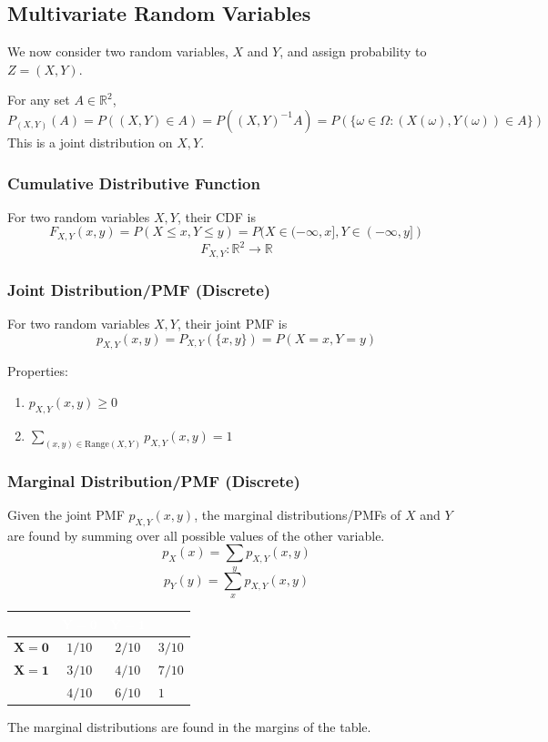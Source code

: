 \documentclass[../Probability.tex]{subfiles}
\begin{document}
\subsection{Multivariate Random Variables}
We now consider two random variables, $X$ and $Y$, and assign probability to $Z=(X,Y)$.

\noindent For any set $A\in\mathbb{R}^2$,
\[P_{(X,Y)}(A) = P((X,Y)\in A) = P((X,Y)^{-1}A) = P(\{\omega\in\Omega:(X(\omega),Y(\omega))\in A\})\]
This is a joint distribution on $X,Y$.

\medskip

\subsubsection{Cumulative Distributive Function} For two random variables $X,Y$, their CDF is
\[F_{X,Y}(x,y) = P(X\leq x,Y\leq y) = P(X\in (-\infty,x],Y\in(-\infty,y])\]
\[F_{X,Y}: \mathbb{R}^2 \rightarrow \mathbb{R}\]

\subsubsection{Joint Distribution/PMF (Discrete)} For two random variables $X,Y$, their joint PMF is
\[p_{X,Y}(x,y) = P_{X,Y}(\{x,y\}) = P(X=x, Y=y)\]

\noindent Properties:
\begin{enumerate}
    \item $p_{X,Y}(x,y) \geq 0$
    \item $\sum\limits_{(x,y)\in\text{Range}(X,Y)}p_{X,Y}(x,y) = 1$
\end{enumerate}

\subsubsection{Marginal Distribution/PMF (Discrete)}
Given the joint PMF $p_{X,Y}(x,y)$, the marginal distributions/PMFs of $X$ and $Y$
are found by summing over all possible values of the other variable.
\[p_X(x) = \sum\limits_{y}p_{X,Y}(x,y)\]
\[p_Y(y) = \sum\limits_{x}p_{X,Y}(x,y)\]

\begin{table}[h]
\centering
\renewcommand{\arraystretch}{1.5} 
\begin{tabular}{l | cc | l}
\rowcolor{blue!80!black} 
\textcolor{white}{} & \textcolor{white}{$\mathbf{Y=0}$} & \textcolor{white}{$\mathbf{Y=1}$} & \textcolor{white}{} \\ \hline
$\mathbf{X=0}$ & $1/10$ & $2/10$ & $3/10$ \\
$\mathbf{X=1}$ & $3/10$ & $4/10$ & $7/10$ \\ \hline
\rowcolor{gray!10} 
& $4/10$ & $6/10$ & $1$ \\
\end{tabular}

\vspace{10pt}
The marginal distributions are found in the margins of the table.
\end{table}
\end{document}
